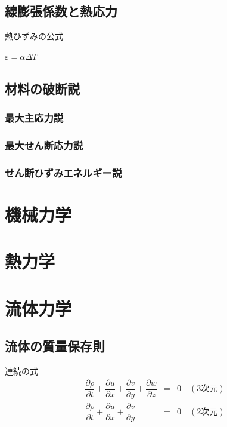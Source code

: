 \documentclass[a4paper]{jsarticle}
\begin{document}
\subsection{線膨張係数と熱応力}
\begin{itembox}[l]{熱ひずみの公式}
    \begin{center}
        $\varepsilon=\alpha\Delta T$
    \end{center}
\end{itembox}
\subsection{材料の破断説}
\subsubsection{最大主応力説}
\subsubsection{最大せん断応力説}
\subsubsection{せん断ひずみエネルギー説}
\newpage
\section{機械力学}
\newpage
\section{熱力学}
\newpage
\section{流体力学}
\subsection{流体の質量保存則}
\begin{itembox}[l]{連続の式}
    \begin{eqnarray*}
        \dfrac{\partial\rho}{\partial t}+\dfrac{\partial u}{\partial x}+\dfrac{\partial v}{\partial y}+\dfrac{\partial w}{\partial z}&=&0\quad(3次元)\\
        \dfrac{\partial\rho}{\partial t}+\dfrac{\partial u}{\partial x}+\dfrac{\partial v}{\partial y}&=&0\quad(2次元)
    \end{eqnarray*}
\end{itembox}
\end{document}
